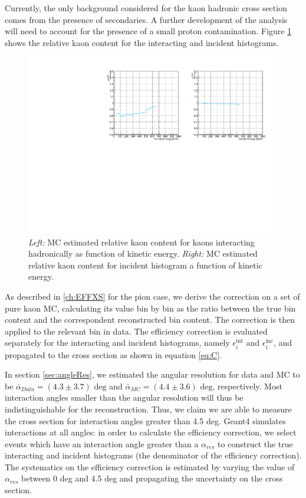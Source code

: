 Currently, the only background considered for the kaon hadronic cross section comes from the presence of secondaries. A further development of the analysis will need to account for the presence of a small proton contamination. Figure \ref{fig:CorrectionsBeamK} shows the relative kaon content for the interacting and incident histograms.
\begin{figure}[p]
\centering
\includegraphics[width=\textwidth]{Chapter-7/Images/KaonBkgSub_WithDK.pdf}
\caption{\emph{Left:} MC estimated relative kaon content for kaons interacting hadronically as function of kinetic energy. \emph{Right:}  MC estimated relative kaon content  for incident histogram a function of kinetic energy.}
\label{fig:CorrectionsBeamK}
\end{figure}


As described in \ref{ch:EFFXS} for the pion case, we derive the correction on a set of pure kaon MC, calculating its value bin by bin as the ratio between the true bin content and the correspondent reconstructed bin content. The correction is then applied to the relevant bin in data. 
The efficiency correction is evaluated separately for the interacting and incident histograms, namely $\epsilon^{\text{int}}_i$ and  $\epsilon^{\text{inc}}_i$, and propagated to the cross section as shown in  equation \ref{eq:C}. 


In section \ref{sec:angleRes}, we estimated the angular resolution for data and MC to be $\bar\alpha_{Data} = (4.3 \pm 3.7) \text{ deg}$  and  $\bar\alpha_{MC} = (4.4 \pm 3.6) \text{ deg}$, respectively.  Most interaction angles smaller than the angular resolution will thus be indistinguishable  for the reconstruction. Thus, we claim we are able to  measure the cross section for interaction angles greater than 4.5 deg. Geant4 simulates interactions at all angles: in order to calculate the efficiency correction,  we select events which have an interaction angle greater than a $\alpha_{res}$ to construct the true interacting and incident histograms (the denominator of the efficiency correction). The systematics on the efficiency correction is estimated by varying the value of $\alpha_{res}$ between 0 deg and 4.5 deg and propagating the uncertainty on the cross section. 

